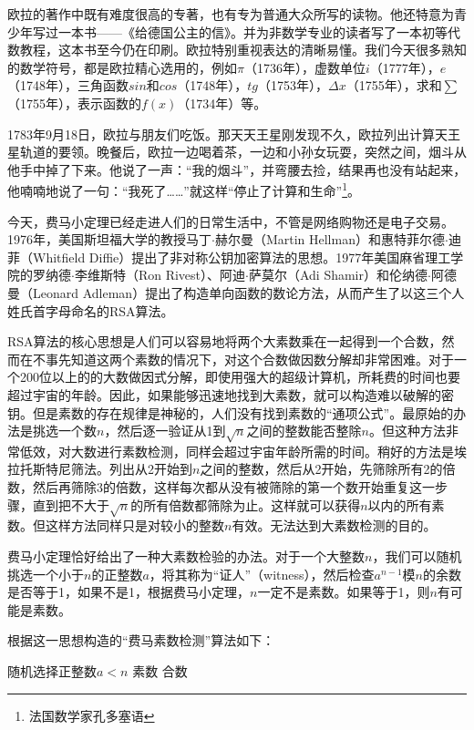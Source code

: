 \documentclass[b5paper]{ctexart}
\begin{document}
欧拉的著作中既有难度很高的专著，也有专为普通大众所写的读物。他还特意为青少年写过一本书——《给德国公主的信》。并为非数学专业的读者写了一本初等代数教程，这本书至今仍在印刷。欧拉特别重视表达的清晰易懂。我们今天很多熟知的数学符号，都是欧拉精心选用的，例如$\pi$（1736年），虚数单位$i$（1777年），$e$（1748年），三角函数$sin$和$cos$（1748年），$tg$（1753年），$\Delta x$（1755年），求和$\sum$（1755年），表示函数的$f(x)$（1734年）等\cite{HanXueTao2009}。

1783年9月18日，欧拉与朋友们吃饭。那天天王星刚发现不久，欧拉列出计算天王星轨道的要领。晚餐后，欧拉一边喝着茶，一边和小孙女玩耍，突然之间，烟斗从他手中掉了下来。他说了一声：“我的烟斗”，并弯腰去捡，结果再也没有站起来，他喃喃地说了一句：“我死了……”就这样“停止了计算和生命”\footnote{法国数学家孔多塞语}。

\vspace{5mm}

今天，费马小定理已经走进人们的日常生活中，不管是网络购物还是电子交易。1976年，美国斯坦福大学的教授马丁$\cdot$赫尔曼（Martin Hellman）和惠特菲尔德$\cdot$迪菲（Whitfield Diffie）提出了非对称公钥加密算法的思想。1977年美国麻省理工学院的罗纳德$\cdot$李维斯特（Ron Rivest）、阿迪$\cdot$萨莫尔（Adi Shamir）和伦纳德$\cdot$阿德曼（Leonard Adleman）提出了构造单向函数的数论方法，从而产生了以这三个人姓氏首字母命名的RSA算法。

RSA算法的核心思想是人们可以容易地将两个大素数乘在一起得到一个合数，然而在不事先知道这两个素数的情况下，对这个合数做因数分解却非常困难。对于一个200位以上的的大数做因式分解，即使用强大的超级计算机，所耗费的时间也要超过宇宙的年龄。因此，如果能够迅速地找到大素数，就可以构造难以破解的密钥。但是素数的存在规律是神秘的，人们没有找到素数的“通项公式”。最原始的办法是挑选一个数$n$，然后逐一验证从1到$\sqrt{n}$之间的整数能否整除$n$。但这种方法非常低效，对大数进行素数检测，同样会超过宇宙年龄所需的时间。稍好的方法是埃拉托斯特尼筛法。列出从2开始到$n$之间的整数，然后从2开始，先筛除所有2的倍数，然后再筛除3的倍数，这样每次都从没有被筛除的第一个数开始重复这一步骤，直到把不大于$\sqrt{n}$的所有倍数都筛除为止。这样就可以获得$n$以内的所有素数。但这样方法同样只是对较小的整数$n$有效。无法达到大素数检测的目的。

费马小定理恰好给出了一种大素数检验的办法。对于一个大整数$n$，我们可以随机挑选一个小于$n$的正整数$a$，将其称为“证人”（witness），然后检查$a^{n-1}$模$n$的余数是否等于1，如果不是1，根据费马小定理，$n$一定不是素数。如果等于1，则$n$有可能是素数。

根据这一思想构造的“费马素数检测”算法如下：

\begin{algorithmic}
  \State 随机选择正整数$a < n$
    \State \Return 素数
  \Else
    \State \Return 合数
  \EndIf
\EndFunction
\end{algorithmic}
\end{document}

